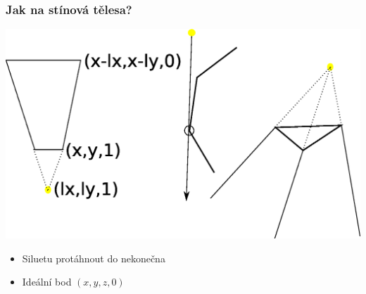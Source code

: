 \begin{frame}
    \frametitle{Jak na stínová tělesa?}

    \includegraphics[width=\textwidth]{pics/shadows/shadowVolumes/shom.eps}

    \vfill

    \begin{itemize}
        \item Siluetu protáhnout do nekonečna
        \item Ideální bod $(x,y,z,0)$
    \end{itemize}
\end{frame}

